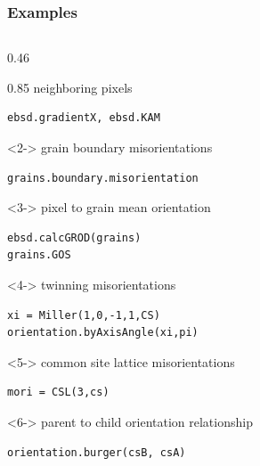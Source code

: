\documentclass[compress,aspectratio=1610,fleqn]{beamer}
\begin{document}
  \begin{frame}[fragile]
    \frametitle{Examples}

    \begin{columns}
      \begin{column}{0.46\textwidth}
        \begin{overlayarea}{\textwidth}{0.85\textheight}
          neighboring pixels
          \vspace{-0.2cm}
          \begin{lstlisting}[style=input]
ebsd.gradientX, ebsd.KAM
  \end{lstlisting}

  \begin{onlyenv}<2->
    grain boundary misorientations \vspace{-0.2cm}
  \begin{lstlisting}[style=input]
grains.boundary.misorientation
  \end{lstlisting}
  \end{onlyenv}

  \begin{onlyenv}<3->
    pixel to grain mean orientation
\vspace{-0.2cm}
        \begin{lstlisting}[style=input]
ebsd.calcGROD(grains)
grains.GOS
  \end{lstlisting}
\end{onlyenv}

\begin{onlyenv}<4->
  twinning misorientations
 \vspace{-0.2cm}
 \begin{lstlisting}[style=input]
xi = Miller(1,0,-1,1,CS)
orientation.byAxisAngle(xi,pi)
  \end{lstlisting}
\end{onlyenv}

\begin{onlyenv}<5->
  common site lattice misorientations
 \vspace{-0.2cm}
  \begin{lstlisting}[style=input]
mori = CSL(3,cs)
  \end{lstlisting}
\end{onlyenv}

\begin{onlyenv}<6->
  parent to child orientation relationship
 \vspace{-0.2cm}
  \begin{lstlisting}[style=input]
orientation.burger(csB, csA)
  \end{lstlisting}
\end{onlyenv}
        \end{overlayarea}


\end{column}
\end{columns}
\end{frame}
\end{document}
